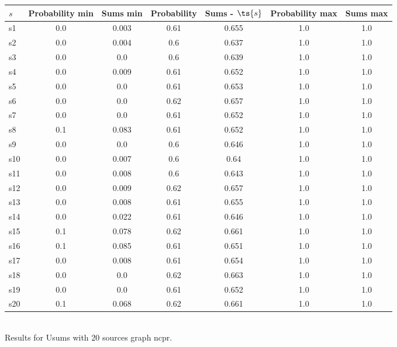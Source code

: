 \documentclass{article}
\begin{document}
\noindent\begin{tabular}{|l|c|c|c|c|c|c|}
\hline
$s$& Probability min & Sums min & Probability & Sums - $\ts{s}$ & Probability max & Sums max\\
\hline
s1 &0.0 & 0.003 & 0.61 & 0.655 & 1.0 & 1.0\\
\hline
s2 &0.0 & 0.004 & 0.6 & 0.637 & 1.0 & 1.0\\
\hline
s3 &0.0 & 0.0 & 0.6 & 0.639 & 1.0 & 1.0\\
\hline
s4 &0.0 & 0.009 & 0.61 & 0.652 & 1.0 & 1.0\\
\hline
s5 &0.0 & 0.0 & 0.61 & 0.653 & 1.0 & 1.0\\
\hline
s6 &0.0 & 0.0 & 0.62 & 0.657 & 1.0 & 1.0\\
\hline
s7 &0.0 & 0.0 & 0.61 & 0.652 & 1.0 & 1.0\\
\hline
s8 &0.1 & 0.083 & 0.61 & 0.652 & 1.0 & 1.0\\
\hline
s9 &0.0 & 0.0 & 0.6 & 0.646 & 1.0 & 1.0\\
\hline
s10 &0.0 & 0.007 & 0.6 & 0.64 & 1.0 & 1.0\\
\hline
s11 &0.0 & 0.008 & 0.6 & 0.643 & 1.0 & 1.0\\
\hline
s12 &0.0 & 0.009 & 0.62 & 0.657 & 1.0 & 1.0\\
\hline
s13 &0.0 & 0.008 & 0.61 & 0.655 & 1.0 & 1.0\\
\hline
s14 &0.0 & 0.022 & 0.61 & 0.646 & 1.0 & 1.0\\
\hline
s15 &0.1 & 0.078 & 0.62 & 0.661 & 1.0 & 1.0\\
\hline
s16 &0.1 & 0.085 & 0.61 & 0.651 & 1.0 & 1.0\\
\hline
s17 &0.0 & 0.008 & 0.61 & 0.654 & 1.0 & 1.0\\
\hline
s18 &0.0 & 0.0 & 0.62 & 0.663 & 1.0 & 1.0\\
\hline
s19 &0.0 & 0.0 & 0.61 & 0.652 & 1.0 & 1.0\\
\hline
s20 &0.1 & 0.068 & 0.62 & 0.661 & 1.0 & 1.0\\
\hline
\end{tabular}\\

\noindent Results for Usums with 20 sources graph ncpr.
\end{document}
